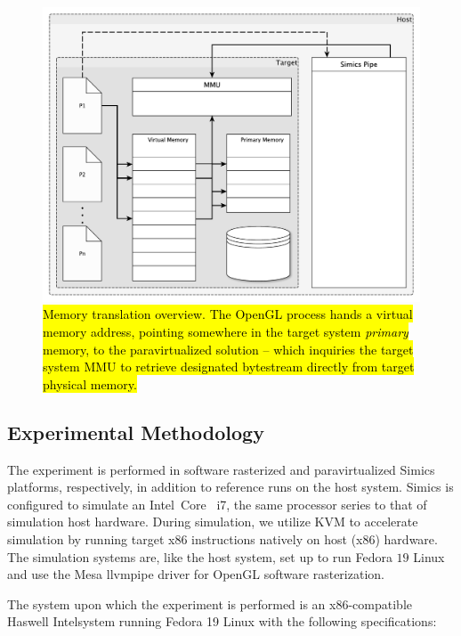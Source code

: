 \begin{figure}
\centering
\includegraphics[width=\linewidth]{img/yedvirtualmemory.pdf}
\caption[Memory translation overview]{\hl{Memory translation overview. The OpenGL process hands a virtual memory address, pointing somewhere in the target system \textit{primary} memory, to the paravirtualized solution -- which inquiries the target system MMU to retrieve designated bytestream directly from target physical memory.}}
\label{fig:virtualmemory}
\end{figure}

\subsection{Experimental Methodology}
\label{sec:experimentalmethodology}
The experiment is performed in software rasterized and paravirtualized Simics platforms, respectively, in addition to reference runs on the host system.
Simics is configured to simulate an Intel\circledR\ Core \texttrademark\ i7, the same processor series to that of simulation host hardware.
During simulation, we utilize KVM to accelerate simulation by running target x86 instructions natively on host (x86) hardware.
The simulation systems are, like the host system, set up to run Fedora $19$ Linux and use the Mesa llvmpipe driver for OpenGL software rasterization.

The system upon which the experiment is performed is an x86-compatible Haswell Intel\circledR system running Fedora 19 Linux with the following specifications:

